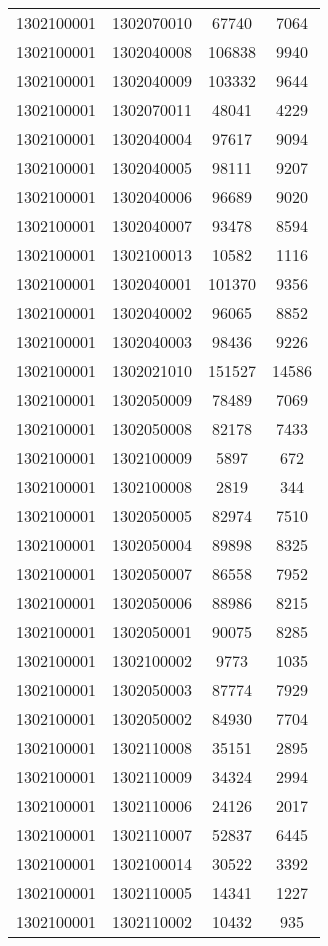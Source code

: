 \begin{longtable}[h]{llcc}
		1302100001 & 1302070010 & 67740 & 7064\\
		1302100001 & 1302040008 & 106838 & 9940\\
		1302100001 & 1302040009 & 103332 & 9644\\
		1302100001 & 1302070011 & 48041 & 4229\\
		1302100001 & 1302040004 & 97617 & 9094\\
		1302100001 & 1302040005 & 98111 & 9207\\
		1302100001 & 1302040006 & 96689 & 9020\\
		1302100001 & 1302040007 & 93478 & 8594\\
		1302100001 & 1302100013 & 10582 & 1116\\
		1302100001 & 1302040001 & 101370 & 9356\\
		1302100001 & 1302040002 & 96065 & 8852\\
		1302100001 & 1302040003 & 98436 & 9226\\
		1302100001 & 1302021010 & 151527 & 14586\\
		1302100001 & 1302050009 & 78489 & 7069\\
		1302100001 & 1302050008 & 82178 & 7433\\
		1302100001 & 1302100009 & 5897 & 672\\
		1302100001 & 1302100008 & 2819 & 344\\
		1302100001 & 1302050005 & 82974 & 7510\\
		1302100001 & 1302050004 & 89898 & 8325\\
		1302100001 & 1302050007 & 86558 & 7952\\
		1302100001 & 1302050006 & 88986 & 8215\\
		1302100001 & 1302050001 & 90075 & 8285\\
		1302100001 & 1302100002 & 9773 & 1035\\
		1302100001 & 1302050003 & 87774 & 7929\\
		1302100001 & 1302050002 & 84930 & 7704\\
		1302100001 & 1302110008 & 35151 & 2895\\
		1302100001 & 1302110009 & 34324 & 2994\\
		1302100001 & 1302110006 & 24126 & 2017\\
		1302100001 & 1302110007 & 52837 & 6445\\
		1302100001 & 1302100014 & 30522 & 3392\\
		1302100001 & 1302110005 & 14341 & 1227\\
		1302100001 & 1302110002 & 10432 & 935\\

\end{longtable}
